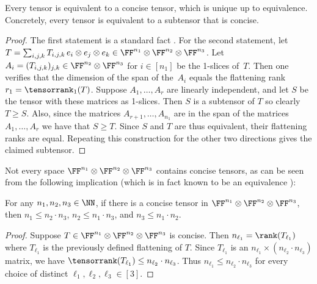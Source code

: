 \begin{lemma}\label{lem:equiv-concise}
    Every tensor is equivalent to a concise tensor, which is unique up to equivalence. Concretely, every tensor is equivalent to a subtensor that is concise.
\end{lemma}
\begin{proof}
    The first statement is a standard fact \cite[Section 14.3]{burgisser1997algebraic}. For the second statement, let $T = \sum_{i,j,k} T_{i,j,k}\, e_i \otimes e_j \otimes e_k \in \FF^{n_1} \otimes \FF^{n_2} \otimes \FF^{n_3}$. Let $A_i = (T_{i,j,k})_{j,k} \in \FF^{n_2} \otimes \FF^{n_3}$ for $i \in [n_1]$ be the 1-slices of~$T$. Then one verifies that the dimension of the span of the~$A_i$ equals the flattening rank $r_1=\tensorrank_1(T)$. Suppose $A_1, \ldots, A_r$ are linearly independent, and let $S$ be the tensor with these matrices as 1-slices. Then $S$ is a subtensor of $T$ so clearly $T \geq S$. Also, since the matrices $A_{r+1}, \ldots, A_{n_1}$ are in the span of the matrices $A_1, \ldots, A_r$ we have that $S \geq T$. Since $S$ and $T$ are thus equivalent, their flattening ranks are equal. Repeating this construction for the other two directions gives the claimed subtensor.
\end{proof}

Not every space $\FF^{n_1} \otimes \FF^{n_2} \otimes \FF^{n_3}$ contains concise tensors, as can be seen from the following implication (which is in fact known to be an equivalence \cite[Theorem~2]{MR2776439}):

\begin{lemma}\label{cl:concise-formats}
For any $n_1,n_2,n_3\in\NN$, if there is a concise tensor in $\FF^{n_1} \otimes \FF^{n_2} \otimes \FF^{n_3}$, then $n_1 \leq n_2\cdot n_3$, $n_2 \leq n_1\cdot n_3$, and $n_3 \leq n_1\cdot n_2$.
\end{lemma}
\begin{proof}
    Suppose $T \in \FF^{n_1} \otimes \FF^{n_2} \otimes \FF^{n_3}$ is concise. Then $n_{\ell_1} = \rank(T_{\ell_1})$ where $T_{\ell_1}$ is the previously defined flattening of $T$. Since $T_{\ell_1}$ is an $n_{\ell_1} \times (n_{\ell_2}\cdot n_{\ell_3})$ matrix, we have $\tensorrank(T_{\ell_1}) \leq n_{\ell_2} \cdot n_{\ell_3}$. Thus $n_{\ell_1} \leq n_{\ell_2} \cdot n_{\ell_3}$ for every choice of distinct ${\ell_1},{\ell_2},{\ell_3} \in [3]$.
\end{proof}
%
%
%
%

